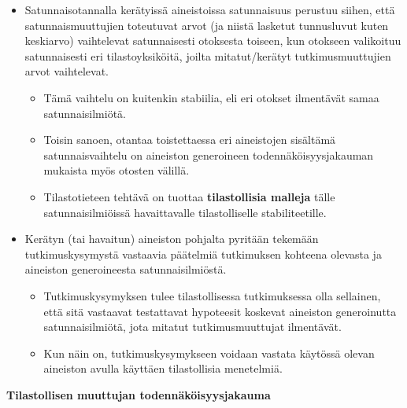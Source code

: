 \documentclass[
]{book}
\providecommand{\tightlist}{%
  \setlength{\itemsep}{0pt}\setlength{\parskip}{0pt}}
\begin{document}
\begin{itemize}
\tightlist
\item
  Satunnaisotannalla kerätyissä aineistoissa satunnaisuus perustuu siihen, että satunnaismuuttujien toteutuvat arvot (ja niistä lasketut tunnusluvut kuten keskiarvo) vaihtelevat satunnaisesti otoksesta toiseen, kun otokseen valikoituu satunnaisesti eri tilastoyksiköitä, joilta mitatut/kerätyt tutkimusmuuttujien arvot vaihtelevat.

  \begin{itemize}
  \tightlist
  \item
    Tämä vaihtelu on kuitenkin stabiilia, eli eri otokset ilmentävät samaa satunnaisilmiötä.
  \item
    Toisin sanoen, otantaa toistettaessa eri aineistojen sisältämä satunnaisvaihtelu on aineiston generoineen todennäköisyysjakauman mukaista myös otosten välillä.
  \item
    Tilastotieteen tehtävä on tuottaa \textbf{tilastollisia malleja} tälle satunnaisilmiöissä havaittavalle tilastolliselle stabiliteetille.
  \end{itemize}
\item
  Kerätyn (tai havaitun) aineiston pohjalta pyritään tekemään tutkimuskysymystä vastaavia päätelmiä tutkimuksen kohteena olevasta ja aineiston generoineesta satunnaisilmiöstä.

  \begin{itemize}
  \tightlist
  \item
    Tutkimuskysymyksen tulee tilastollisessa tutkimuksessa olla sellainen, että sitä vastaavat testattavat hypoteesit koskevat aineiston generoinutta satunnaisilmiötä, jota mitatut tutkimusmuuttujat ilmentävät.
  \item
    Kun näin on, tutkimuskysymykseen voidaan vastata käytössä olevan aineiston avulla käyttäen tilastollisia menetelmiä.
  \end{itemize}
\end{itemize}

\textbf{Tilastollisen muuttujan todennäköisyysjakauma}
\end{document}
